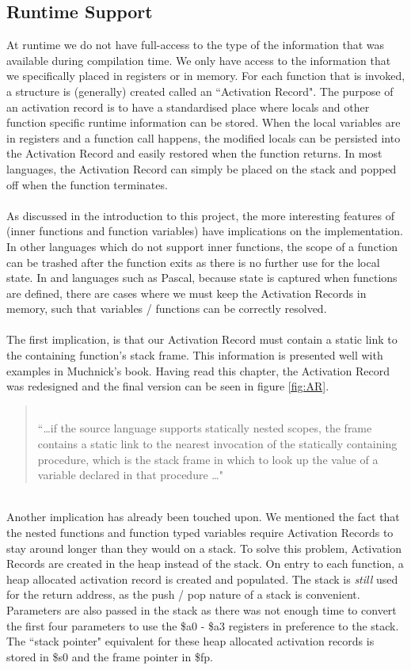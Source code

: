 \subsection{Runtime Support}
At runtime we do not have full-access to the type of the information that was available during compilation time. We only have access to the information that we specifically placed in registers or in memory. For each function that is invoked, a structure is (generally) created called an ``Activation Record". The purpose of an activation record is to have a standardised place where locals and other function specific runtime information can be stored. When the local variables are in registers and a function call happens, the modified locals can be persisted into the Activation Record and easily restored when the function returns. In most languages, the Activation Record can simply be placed on the stack and popped off when the function terminates.
\ \\ \ \\
As discussed in the introduction to this project, the more interesting features of \mmc (inner functions and function variables) have implications on the implementation. In other languages which do not support inner functions, the scope of a function can be trashed after the function exits as there is no further use for the local state. In \mmc and languages such as Pascal, because state is captured when functions are defined, there are cases where we must keep the Activation Records in memory, such that variables / functions can be correctly resolved.
\ \\ \ \\
The first implication, is that our Activation Record must contain a static link to the containing function's stack frame. This information is presented well with examples in Muchnick's book. Having read this chapter, the Activation Record was redesigned and the final version can be seen in figure \ref{fig:AR}.
\begin{quotation}
\ \\
``\ldots if the source language supports statically nested scopes, the frame contains a static link to the nearest invocation of the statically containing procedure, which is the stack frame in which to look up the value of a variable declared in that procedure \ldots"\cite{muchnick1997}
\end{quotation}
\ \\
Another implication has already been touched upon. We mentioned the fact that the nested functions and function typed variables require Activation Records to stay around longer than they would on a stack. To solve this problem, Activation Records are created in the heap instead of the stack. On entry to each function, a heap allocated activation record is created and populated. The stack is \emph{still} used for the return address, as the push / pop nature of a stack is convenient. Parameters are also passed in the stack as there was not enough time to convert the first four parameters to use the \$a0 - \$a3 registers in preference to the stack. The ``stack pointer" equivalent for these heap allocated activation records is stored in \$s0 and the frame pointer in \$fp.
